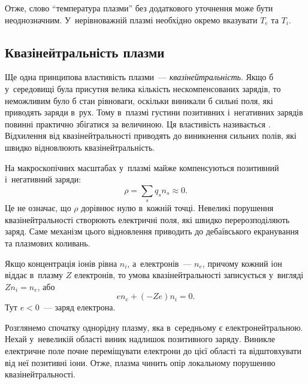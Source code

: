 Отже, слово \enquote{температура плазми} без додаткового уточнення може бути неоднозначним. У~нерівноважній плазмі необхідно окремо вказувати $T_e$ та $T_i$.

\subsection{Квазінейтральність плазми}

Ще одна принципова властивість плазми~--- \emph{квазінейтральність}. Якщо б у~середовищі була присутня велика кількість нескомпенсованих зарядів, то неможливим було б стан рівноваги, оскільки виникали б сильні поля, які приводять заряди в~рух. Тому в~плазмі густини позитивних і~негативних зарядів повинні практично збігатися за величиною. Ця властивість називається . Відхилення від квазінейтральності приводять до виникнення сильних полів, які швидко відновлюють квазінейтральність.

На макроскопічних масштабах у~плазмі майже компенсуються позитивний і~негативний заряди:
\begin{equation}
	\rho = \sum_s q_s n_s \approx 0.
\end{equation}
Це не означає, що $\rho$ дорівнює нулю в~кожній точці. Невеликі порушення квазінейтральності створюють електричні поля, які швидко перерозподіляють заряд. Саме механізм цього відновлення приводить до дебаївського екранування та плазмових коливань.

Якщо концентрація іонів рівна $n_i$, а~електронів~--- $n_e$, причому кожний іон віддає в~плазму $Z$ електронів, то умова квазінейтральності записується у~вигляді $Zn_i = n_e$, або
\begin{equation}\label{eq:quasineutrality}
	e n_e + (-Ze) n_i = 0.
\end{equation}
Тут $e < 0$~--- заряд електрона.

Розглянемо спочатку однорідну плазму, яка в~середньому є електронейтральною. Нехай у~невеликій області виник надлишок позитивного заряду. Виникле електричне поле почне переміщувати електрони до цієї області та відштовхувати від неї позитивні іони. Отже, плазма чинить опір локальному порушенню квазінейтральності.


